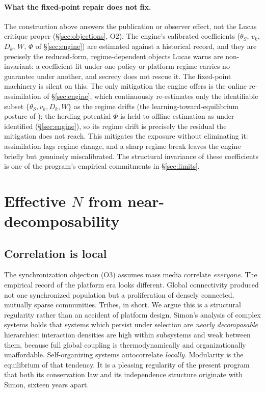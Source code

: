 \documentclass[11pt]{article}
\begin{document}
\paragraph{What the fixed-point repair does not fix.} The construction above answers the publication or observer effect, not the Lucas critique proper (\S\ref{sec:objections}, O2). The engine's calibrated coefficients ($\theta_S$, $v_k$, $D_k$, $W$, $\Phi$ of \S\ref{sec:engine}) are estimated against a historical record, and they are precisely the reduced-form, regime-dependent objects Lucas warns are non-invariant: a coefficient fit under one policy or platform regime carries no guarantee under another, and secrecy does not rescue it. The fixed-point machinery is silent on this. The only mitigation the engine offers is the online re-assimilation of \S\ref{sec:engine}, which continuously re-estimates only the identifiable subset $\{\theta_S, v_k, D_k, W\}$ as the regime drifts (the learning-toward-equilibrium posture of \cite{hansensargent2008}); the herding potential $\Phi$ is held to offline estimation as under-identified (\S\ref{sec:engine}), so its regime drift is precisely the residual the mitigation does not reach. This mitigates the exposure without eliminating it: assimilation lags regime change, and a sharp regime break leaves the engine briefly but genuinely miscalibrated. The structural invariance of these coefficients is one of the program's empirical commitments in \S\ref{sec:limits}.

\section{Effective $N$ from near-decomposability}
\label{sec:blocks}

\subsection{Correlation is local}

The synchronization objection (O3) assumes mass media correlate \emph{everyone}. The empirical record of the platform era looks different. Global connectivity produced not one synchronized population but a proliferation of densely connected, mutually sparse communities. Tribes, in short. We argue this is a structural regularity rather than an accident of platform design. Simon's analysis of complex systems \cite{simon1962} holds that systems which persist under selection are \emph{nearly decomposable} hierarchies: interaction densities are high within subsystems and weak between them, because full global coupling is thermodynamically and organizationally unaffordable. Self-organizing systems autocorrelate \emph{locally}. Modularity is the equilibrium of that tendency. It is a pleasing regularity of the present program that both its conservation law and its independence structure originate with Simon, sixteen years apart.
\end{document}

